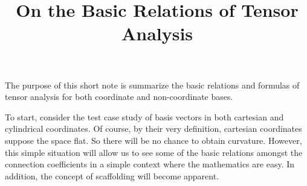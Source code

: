 \documentclass[12pt]{article}
\begin{document}
\title{On the Basic Relations of Tensor Analysis}
\maketitle


The purpose of this short note is summarize the basic relations
and formulas of tensor analysis for both coordinate and
non-coordinate bases.

To start, consider the test case study of basis vectors in both cartesian
and cylindrical coordinates.  Of course, by their very definition,
cartesian coordinates suppose the space flat.  So there will be
no chance to obtain curvature.  However, this simple situation will
allow us to see some of the basic relations amongst the connection coefficients
in a simple context where the mathematics are easy.  In addition, the
concept of scaffolding will become apparent.
\end{document}
